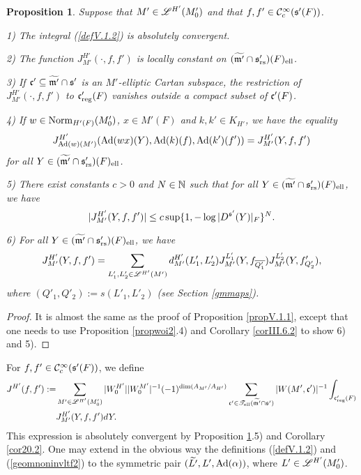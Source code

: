 \documentclass[a4paper]{amsart}
\newcommand{\fm}{{\mathfrak{m}}} \newcommand{\fn}{{\mathfrak{n}}}\newcommand{\fo}{{\mathfrak{o}}} \newcommand{\fp}{{\mathfrak{p}}}
\newcommand{\ov}{\overline}
\newcommand{\wt}{\widetilde}                        \newcommand{\wh}{\widehat}                      \newcommand{\wpair}[1]{\left\{{#1}\right\}}
\newtheorem{prop}[thm]{Proposition}
\theoremstyle{definition}
\theoremstyle{remark}
\numberwithin{equation}{subsection}
\begin{document}
\begin{prop}\label{propV.1.2}
Suppose that $M'\in\mathscr{L}^{H'}(M'_0)$ and that $f,f'\in{\mathcal {C}}_c^\infty({\mathfrak{s}}'(F))$. 

1) The integral (\ref{defV.1.2}) is absolutely convergent. 

2) The function $J_{M'}^{H'}(\cdot, f, f')$ is locally constant on $(\wt{\fm'}\cap\fs'_\rs)(F)_\el$. 

3) If $\fc'\subseteq\wt{\fm'}\cap\fs'$ is an $M'$-elliptic Cartan subspace, the restriction of $J_{M'}^{H'}(\cdot, f, f')$ to ${\mathfrak{c}}'_{\mathrm{reg}}(F)$ vanishes outside a compact subset of ${\mathfrak{c}}'(F)$. 

4) If $w\in {\mathrm{Norm}}_{H'(F)}(M'_0)$, $x\in M'(F)$ and $k, k'\in K_{H'}$, we have the equality
$$ J_{{\mathrm{Ad}}(w)(M')}^{H'}({\mathrm{Ad}}(wx)(Y), {\mathrm{Ad}}(k)(f), {\mathrm{Ad}}(k')(f'))=J_{M'}^{H'}(Y, f, f') $$
for all $Y\in(\wt{\fm'}\cap\fs'_\rs)(F)_\el$. 

5) There exist constants $c>0$ and $N\in{\mathbb {N}}$ such that for all $Y\in(\wt{\fm'}\cap\fs'_\rs)(F)_\el$, we have
$$ |J_{M'}^{H'}(Y, f, f')| \leq c \sup\{1, -\log |D^{{\mathfrak{s}}'}(Y)|_F\}^N. $$

6) For all $Y\in(\wt{\fm'}\cap\fs'_\rs)(F)_\el$, we have
$$ J_{M'}^{H'}(Y, f, f')=\sum_{L'_1,L'_2\in\msl^{H'}(M')} d_{M'}^{H'}(L'_1,L'_2) J_{M'}^{L'_1}(Y,f_{\ov{Q'_1}}) J_{M'}^{L'_2}(Y,f'_{Q'_2}), $$
where $(Q'_1,Q'_2):=s(L'_1,L'_2)$ (see Section \ref{gmmaps}). 
\end{prop}

\begin{proof}
It is almost the same as the proof of Proposition \ref{propV.1.1}, except that one needs to use Proposition \ref{propwoi2}.4) and Corollary \ref{corIII.6.2} to show 6) and 5). 
\end{proof}

For $f,f'\in{\mathcal {C}}_c^\infty({\mathfrak{s}}'(F))$, we define
\begin{equation}\label{geomnoninvltf2}
\begin{split}
 J^{H'}(f, f'):=&\sum_{M'\in\msl^{H'}(M'_0)} |W_0^{H'}||W_0^{M'}|^{-1} (-1)^{\dim(A_{M'}/A_{H'})} \sum_{\fc'\in\mst_\el(\wt{\fm'}\cap\fs')} |W(M', \fc')|^{-1} \int_{\fc'_\reg(F)} \\
&J_{M'}^{H'}(Y, f, f') dY. 
\end{split}
\end{equation}
This expression is absolutely convergent by Proposition \ref{propV.1.2}.5) and Corollary \ref{cor20.2}. One may extend in the obvious way the definitions (\ref{defV.1.2}) and (\ref{geomnoninvltf2}) to the symmetric pair $(\wt{L'}, L', \Ad(\alpha))$, where $L'\in\mathscr{L}^{H'}(M'_0)$. 
\end{document}
